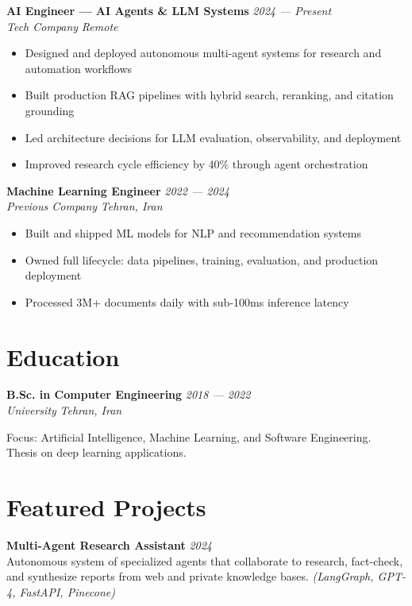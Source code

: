 \documentclass[11pt,a4paper]{article}
\newcommand{\cventry}[4]{%
    \noindent\textbf{#1} \hfill \textit{\color{mutedtext}#2}\\
    \textit{#3} \hfill \textit{\color{mutedtext}#4}\\
    \vspace{0.2em}
}
\begin{document}
\cventry{AI Engineer — AI Agents \& LLM Systems}{2024 — Present}{Tech Company}{Remote}
\begin{itemize}[leftmargin=*, itemsep=2pt]
    \item Designed and deployed autonomous multi-agent systems for research and automation workflows
    \item Built production RAG pipelines with hybrid search, reranking, and citation grounding
    \item Led architecture decisions for LLM evaluation, observability, and deployment
    \item Improved research cycle efficiency by 40\% through agent orchestration
\end{itemize}

\vspace{0.6em}

\cventry{Machine Learning Engineer}{2022 — 2024}{Previous Company}{Tehran, Iran}
\begin{itemize}[leftmargin=*, itemsep=2pt]
    \item Built and shipped ML models for NLP and recommendation systems
    \item Owned full lifecycle: data pipelines, training, evaluation, and production deployment
    \item Processed 3M+ documents daily with sub-100ms inference latency
\end{itemize}

\section*{Education}
\cventry{B.Sc. in Computer Engineering}{2018 — 2022}{University}{Tehran, Iran}
Focus: Artificial Intelligence, Machine Learning, and Software Engineering.\\
Thesis on deep learning applications.

\section*{Featured Projects}

\textbf{Multi-Agent Research Assistant} \hfill \textit{\color{mutedtext}2024}\\
Autonomous system of specialized agents that collaborate to research, fact-check, and synthesize reports from web and private knowledge bases. \textit{(LangGraph, GPT-4, FastAPI, Pinecone)}

\vspace{0.4em}
\end{document}

